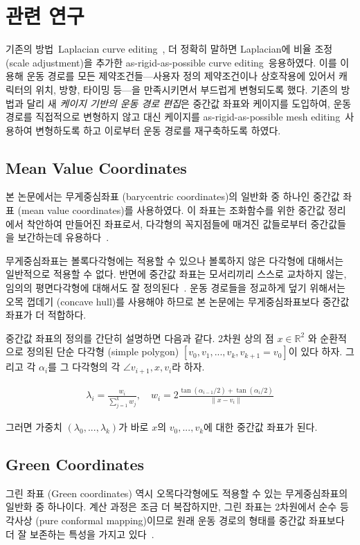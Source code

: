 \documentclass[12pt,a4paper,oneside,final]{report}
\newcommand{\Kim}{\cite{Kim:2009:SMM:1531326.1531385}}
\newcommand{\Igarashi}{\cite{Igarashi:2005:ASM:1073204.1073323}}
\newcommand{\Floater}{\cite{Floater200319}}
\newcommand{\Hormann}{\cite{Hormann:2006:MVC:1183287.1183295}}
\newcommand{\Lipman}{\cite{Lipman:2008:GC:1360612.1360677}}
\newcommand{\Sorkine}{\cite{Sorkine:2004:LSE:1057432.1057456}}
\providecommand{\norm}[1]{\lVert#1\rVert}
\begin{document}
\chapter{관련 연구}
기존의 방법~ Laplacian curve editing~\Sorkine, 더 정확히 말하면
Laplacian에 비율 조정 (scale adjustment)을 추가한 as-rigid-as-possible curve
editing~ 응용하였다. 이를 이용해 운동 경로를 모든
제약조건들---사용자 정의 제약조건이나 상호작용에 있어서 캐릭터의 위치, 방향,
타이밍 등---을 만족시키면서 부드럽게 변형되도록 했다. 기존의 방법과 달리 새
\emph{케이지 기반의 운동 경로 편집}은 중간값 좌표와 케이지를 도입하여, 운동
경로를 직접적으로 변형하지 않고 대신 케이지를 as-rigid-as-possible mesh
editing~ 사용하여 변형하도록 하고 이로부터 운동 경로를 재구축하도록
하였다.

\section{Mean Value Coordinates} 본 논문에서는 무게중심좌표
(barycentric coordinates)의 일반화 중 하나인 중간값 좌표 (mean value
coordinates)를 사용하였다. 이 좌표는 조화함수를 위한 중간값 정리에서 착안하여
만들어진 좌표로서, 다각형의 꼭지점들에 매겨진 값들로부터 중간값들을 보간하는데
유용하다~\Floater.

무게중심좌표는 볼록다각형에는 적용할 수 있으나 볼록하지 않은 다각형에 대해서는
일반적으로 적용할 수 없다. 반면에 중간값 좌표는 모서리끼리 스스로 교차하지
않는, 임의의 평면다각형에 대해서도 잘 정의된다~\Hormann. 운동 경로들을 정교하게
덮기 위해서는 오목 껍데기 (concave hull)를 사용해야 하므로 본 논문에는
무게중심좌표보다 중간값 좌표가 더 적합하다.

중간값 좌표의 정의를 간단히 설명하면 다음과 같다. 2차원 상의 점 $x \in
\mathbb{R}^2$ 와 순환적으로 정의된 단순 다각형 (simple polygon) $[v_0, v_1,
..., v_k, v_{k+1} = v_0]$이 있다 하자. 그리고 각 $\alpha_i$를 그 다각형의 각
$\angle v_{i+1},x,v_{i}$라 하자.

\begin{align}
\lambda_i = \frac{w_i}{\sum_{j=1}^{k}w_j}, \quad w_i =
2\frac{\tan(\alpha_{i-1}/2) + \tan(\alpha_{i}/2)}{\norm{x - v_i}}
\end{align}

그러면 가중치 $(\lambda_0, ..., \lambda_k)$가 바로 $x$의 $v_0, ...  , v_k$에
대한 중간값 좌표가 된다.

\section{Green Coordinates}
그린 좌표 (Green coordinates) 역시 오목다각형에도 적용할 수 있는
무게중심좌표의 일반화 중 하나이다. 계산 과정은 조금 더 복잡하지만, 그린 좌표는
2차원에서 순수 등각사상 (pure conformal mapping)이므로 원래 운동 경로의 형태를
중간값 좌표보다 더 잘 보존하는 특성을 가지고 있다~\Lipman.
\end{document}
